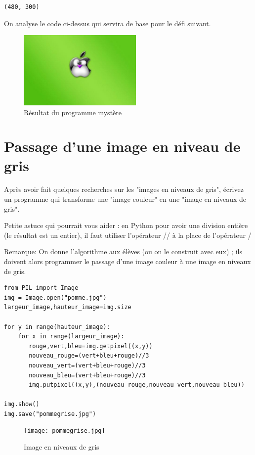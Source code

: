 \documentclass[11pt]{article}
\begin{document}
\begin{verbatim}
(480, 300)
\end{verbatim}



On analyse le code ci-dessus qui servira de base pour le défi suivant.

\begin{figure}[htbp]
\centering
\includegraphics[width=6cm]{pommeMystere.jpg}
\caption{Résultat du programme mystère}
\end{figure}


\section{Passage d'une image en niveau de gris}
\label{sec:org155b6b7}

Après avoir fait quelques recherches sur les "images en niveaux de gris", écrivez un programme qui transforme une "image couleur" en une "image en niveaux de gris".

Petite astuce qui pourrait vous aider : en Python pour avoir une division entière (le résultat est un entier), il faut utiliser l'opérateur // à la place de l'opérateur / 

Remarque: On donne l'algorithme aux élèves (ou on le construit avec eux) ; ils doivent alors programmer le passage d'une image couleur à une image en niveaux de gris.


\begin{verbatim}
from PIL import Image
img = Image.open("pomme.jpg")
largeur_image,hauteur_image=img.size

for y in range(hauteur_image):
    for x in range(largeur_image):
       rouge,vert,bleu=img.getpixel((x,y))
       nouveau_rouge=(vert+bleu+rouge)//3
       nouveau_vert=(vert+bleu+rouge)//3
       nouveau_bleu=(vert+bleu+rouge)//3
       img.putpixel((x,y),(nouveau_rouge,nouveau_vert,nouveau_bleu))

img.show()
img.save("pommegrise.jpg")
\end{verbatim}

\begin{figure}[htbp]
\centering
\texttt{[image: pommegrise.jpg]}
\caption{Image en niveaux de gris}
\end{figure}
\end{document}

